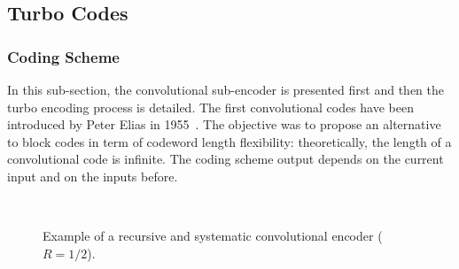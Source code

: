 

\subsection{Turbo Codes}
\label{sec:ctx_turbo}

\subsubsection{Coding Scheme}

In this sub-section, the convolutional sub-encoder is presented first and then
the turbo encoding process is detailed. The first convolutional codes have been
introduced by Peter Elias in 1955~\cite{Elias1955}. The objective was to propose
an alternative to block codes in term of codeword length flexibility:
theoretically, the length of a convolutional code is infinite. The coding scheme
output depends on the current input and on the inputs before.

\begin{figure}[htp]
  \centering
  \quad
  \\
  \caption{Example of a recursive and systematic convolutional encoder ($R =
    1/2$).}
  \label{fig:ctx_turbo_sub_encoder}
\end{figure}

